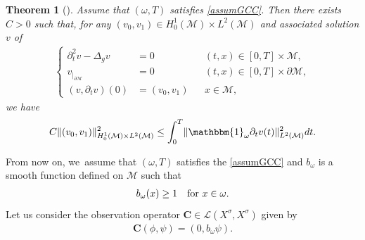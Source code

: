 \documentclass[10pt]{amsart}
\newtheorem{theorem}{Theorem}[section]
\theoremstyle{definition}
\let\mc\mathcal
\newcommand{\M}{\mc{M}}
\newcommand{\bC}{\boldsymbol{C}}
\providecommand{\norm}[1]{\lVert#1\rVert}
\begin{document}
\begin{theorem}[\cite{BLR:88}]\label{thm:blr-wave}
Assume that $(\omega, T)$ satisfies \ref{assumGCC}. Then there exists $C>0$ such that, for any $(v_0, v_1)\in H_0^1(\M)\times L^2(\M)$ and associated solution $v$ of
\begin{align}\label{eq:linear-waves}
\left\{\begin{aligned}
\partial_t^2 v-\Delta_g v&=0 &&(t, x)\in [0, T]\times\M,\\
v_{|_{\partial\M}}&=0 &&(t, x)\in [0, T]\times\partial\M,\\
(v, \partial_t v)(0)&=(v_0, v_1) &&x\in \M,
\end{aligned}\right.
\end{align}
we have
\begin{align}\label{thm:ineq:linear-waves-obs}
C\norm{(v_0, v_1)}_{H_0^1(\M)\times L^2(\M)}^2\leq \int_0^T \norm{\mathbbm{1}_\omega\partial_t v(t)}_{L^2(\M)}^2 dt.
\end{align}
\end{theorem}
From now on, we~assume that $(\omega, T)$ satisfies the \ref{assumGCC} and $b_\omega$ is a smooth function defined on $\M$ such that
\begin{align}
\label{lowerb}
b_{\omega}(x)\geq 1 \quad\textnormal{for }x\in \omega.
\end{align}
Let us consider the observation operator $\bC\in \mc{L}(X^\sigma, X^\sigma)$ given by
\begin{align}\label{eq:observation-operator-wave}
\bC(\phi, \psi)=(0, b_\omega\psi).
\end{align}
\end{document}
